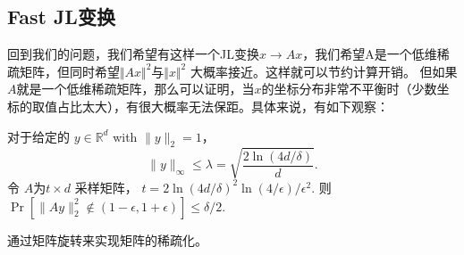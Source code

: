 \documentclass[lang=cn,newtx,10pt,scheme=chinese,chinesefont=nofont,citestyle=gb7714-2015, bibstyle=gb7714-2015]{elegantbook}
\begin{document}
\begin{refsection}




\subsection{Fast JL变换}

回到我们的问题，我们希望有这样一个JL变换$x\rightarrow Ax$，我们希望A是一个低维稀疏矩阵，但同时希望$\Vert Ax\Vert^2$与$\Vert x\Vert^2$
大概率接近。这样就可以节约计算开销。
但如果$A$就是一个低维稀疏矩阵，那么可以证明，当$x$的坐标分布非常不平衡时（少数坐标的取值占比太大），有很大概率无法保距。具体来说，有如下观察：

\begin{proposition}
    对于给定的 $y\in\mathbb{R}^d$ with $\|y\|_2 = 1$， $$\|y\|_\infty \leq \lambda = \sqrt{\frac{2\ln(4d/\delta)}{d}}.$$ 令 $A$为$t\times d$ 采样矩阵， $t=2\ln(4d/\delta)^2\ln(4/\epsilon)/\epsilon^2$. 则 $\Pr\left[\|Ay\|^2_2\not\in (1-\epsilon,1+\epsilon)\right]\leq \delta/2.$
\end{proposition}

\cite{Ailon2006ApproximateNN}通过矩阵旋转来实现矩阵的稀疏化。



\end{refsection}
\end{document}
